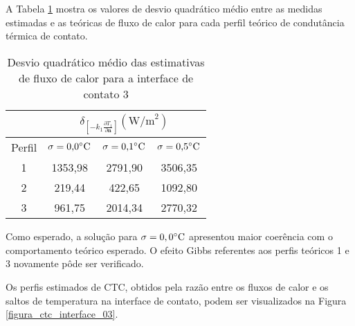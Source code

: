 A Tabela \ref{tabela_rms_fluxo_calor_interface_3} mostra os valores de desvio quadrático médio entre as medidas estimadas e as teóricas de fluxo de calor para cada perfil teórico de condutância térmica de contato.
\begin{table}[H]
	\centering
	\caption{Desvio quadrático médio das estimativas de fluxo de calor para a interface de contato 3}
	\begin{tabular}{c|c|c|c|}
		\cline{2-4}
		& \multicolumn{3}{c|}{$\delta_{\left[-k_1 \frac{\partial T_1}{\partial \mathbf{n}}\right]}(\text{W/m}^2)$} \\ \hline
		\multicolumn{1}{|c|}{Perfil} & $\sigma = \text{0,0}\celsius$   & $\sigma = \text{0,1}\celsius$    & $\sigma = \text{0,5}\celsius$  \\ \hline
		\multicolumn{1}{|c|}{1}      & 1353,98       & 2791,90       & 3506,35     \\ \hline
		\multicolumn{1}{|c|}{2}      & 219,44       & 422,65       & 1092,80      \\ \hline
		\multicolumn{1}{|c|}{3}      & 961,75       & 2014,34       & 2770,32      \\ \hline
	\end{tabular}
	\label{tabela_rms_fluxo_calor_interface_3}
\end{table}

Como esperado, a solução para $\sigma = 0,0\celsius$ apresentou maior coerência com o comportamento teórico esperado. O efeito Gibbs referentes aos perfis teóricos 1 e 3 novamente pôde ser verificado.

%
%

Os perfis estimados de CTC, obtidos pela razão entre os fluxos de calor e os saltos de temperatura na interface de contato, podem ser visualizados na Figura \ref{figura_ctc_interface_03}.

